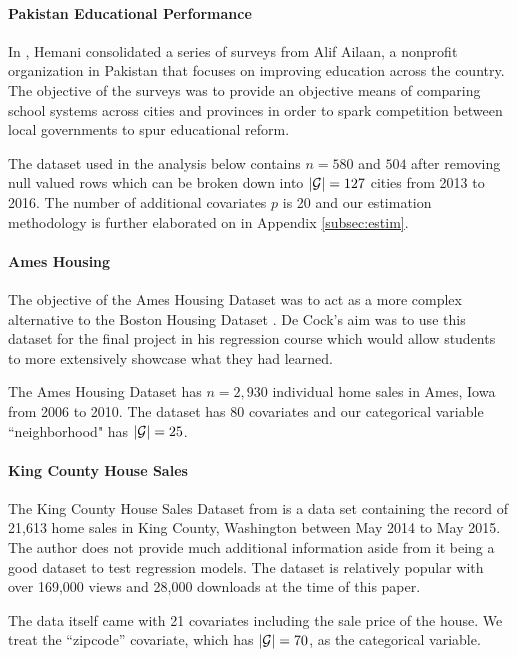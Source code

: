 \documentclass{article}
\theoremstyle{plain}
\theoremstyle{definition}
\theoremstyle{remark}
\begin{document}
\paragraph{Pakistan Educational Performance}

In \cite{pakistanEducation}, Hemani consolidated a series of surveys from Alif Ailaan, a nonprofit organization in Pakistan that focuses on improving education across the country. The objective of the surveys was to provide an objective means of comparing school systems across cities and provinces in order to spark competition between local governments to spur educational reform.

The dataset used in the analysis below contains $n = 580$ and $504$ after removing null valued rows which can be broken down into $|\mathcal{G}| = 127$ cities from 2013 to 2016. The number of additional covariates $p$ is 20 and our estimation methodology is further elaborated on in Appendix \ref{subsec:estim}.


\paragraph{Ames Housing}

The objective of the Ames Housing Dataset \cite{de2011ames} was to act as a more complex alternative to the Boston Housing Dataset \cite{harrison1978hedonic}. De Cock's aim was to use this dataset for the final project in his regression course which would allow students to more extensively showcase what they had learned.

The Ames Housing Dataset has $n=2,930$ individual home sales in Ames, Iowa from 2006 to 2010. The dataset has 80 covariates and our categorical variable ``neighborhood" has $|\mathcal{G}|=25$.

\paragraph{King County House Sales}

The King County House Sales Dataset from \cite{houseSalesKingCounty} is a data set containing the record of 21,613 home sales in King County, Washington between May 2014 to May 2015. The author does not provide much additional information aside from it being a good dataset to test regression models. The dataset is relatively popular with over 169,000 views and 28,000 downloads at the time of this paper.

The data itself came with 21 covariates including the sale price of the house. We treat the ``zipcode'' covariate, which has $|\mathcal{G}|=70$, as the categorical variable.
\end{document}
